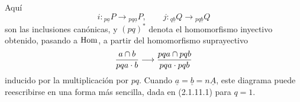 
Aquí
\[
 i:{}_{p\underline a}P\longrightarrow{}_{pq\underline a}P,
 \qquad
 j:{}_{q\underline b}Q\longrightarrow{}_{pq\underline b}Q
\]
son las inclusiones canónicas, y $(pq)^*$ denota el homomorfismo
inyectivo obtenido, pasando a $\uHom$, a partir del homomorfismo
suprayectivo
\[
 \frac{\underline a\cap\underline b}
      {pq\underline a\mathbin{\cdot}\underline b}
 \longrightarrow
 \frac{pq\underline a\cap\sisi{\underline b}{pq\underline b}}
      {pq\underline a\mathbin{\cdot}pq\underline b}
\]
inducido por la multiplicación por $pq$. Cuando
$\underline a=\underline b=n\underline A$, este diagrama puede
reescribirse en una forma más sencilla, dada en (2.1.11.1) para
$q=1$.
